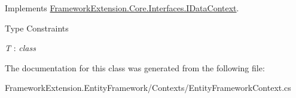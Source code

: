 Implements \hyperlink{interface_framework_extension_1_1_core_1_1_interfaces_1_1_i_data_context_a1297c0d6e59ec05855d8e25a72f49fdd}{Framework\-Extension.\-Core.\-Interfaces.\-I\-Data\-Context}.

\begin{Desc}
\item[Type Constraints]\begin{description}
\item[{\em T} : {\em class}]\end{description}
\end{Desc}


The documentation for this class was generated from the following file\-:\begin{DoxyCompactItemize}
\item 
Framework\-Extension.\-Entity\-Framework/\-Contexts/Entity\-Framework\-Context.\-cs\end{DoxyCompactItemize}
